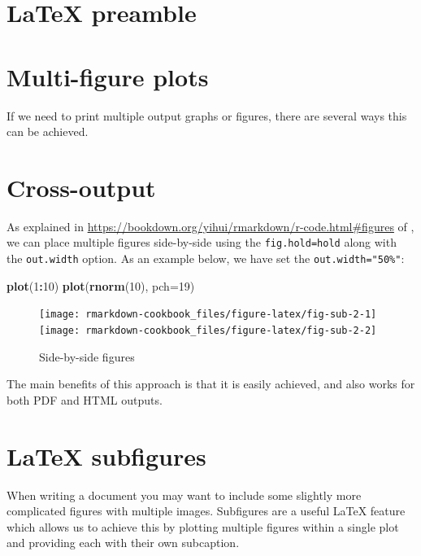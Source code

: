 \documentclass[]{book}
\newenvironment{Shaded}{\begin{snugshade}}{\end{snugshade}}
\newcommand{\KeywordTok}[1]{\textcolor[rgb]{0.13,0.29,0.53}{\textbf{#1}}}
\newcommand{\DataTypeTok}[1]{\textcolor[rgb]{0.13,0.29,0.53}{#1}}
\newcommand{\DecValTok}[1]{\textcolor[rgb]{0.00,0.00,0.81}{#1}}
\newcommand{\OperatorTok}[1]{\textcolor[rgb]{0.81,0.36,0.00}{\textbf{#1}}}
\newcommand{\NormalTok}[1]{#1}
\begin{document}
\section{LaTeX preamble}\label{latex-preamble}

\section{Multi-figure plots}\label{multi-figure-plots}

If we need to print multiple output graphs or figures, there are several
ways this can be achieved.

\section{Cross-output}\label{cross-output}

As explained in
\url{https://bookdown.org/yihui/rmarkdown/r-code.html\#figures} of
\citet{xie2018}, we can place multiple figures side-by-side using the
\texttt{fig.hold=\textquotesingle{}hold\textquotesingle{}} along with
the \texttt{out.width} option. As an example below, we have set the
\texttt{out.width="50\%"}:

\begin{Shaded}
\begin{Highlighting}[]
\KeywordTok{plot}\NormalTok{(}\DecValTok{1}\OperatorTok{:}\DecValTok{10}\NormalTok{)}
\KeywordTok{plot}\NormalTok{(}\KeywordTok{rnorm}\NormalTok{(}\DecValTok{10}\NormalTok{), }\DataTypeTok{pch=}\DecValTok{19}\NormalTok{)}
\end{Highlighting}
\end{Shaded}

\begin{figure}
\texttt{[image: rmarkdown-cookbook\_files/figure-latex/fig-sub-2-1]} \texttt{[image: rmarkdown-cookbook\_files/figure-latex/fig-sub-2-2]} \caption{Side-by-side figures}\label{fig:fig-sub-2}
\end{figure}

The main benefits of this approach is that it is easily achieved, and
also works for both PDF and HTML outputs.

\section{LaTeX subfigures}\label{latex-subfigures}

When writing a document you may want to include some slightly more
complicated figures with multiple images. Subfigures are a useful LaTeX
feature which allows us to achieve this by plotting multiple figures
within a single plot and providing each with their own subcaption.
\end{document}
